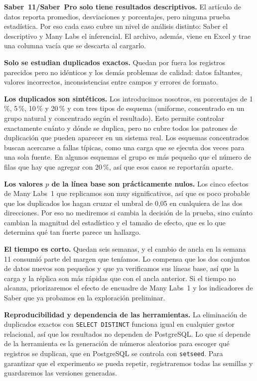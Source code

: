 \documentclass[11pt,openany,oneside,letterpaper]{book}
\begin{document}
\textbf{Saber~11/Saber~Pro solo tiene resultados descriptivos.} El artículo de datos reporta promedios, desviaciones y porcentajes, pero ninguna prueba estadística. Por eso cada caso cubre un nivel de análisis distinto: Saber el descriptivo y Many Labs el inferencial. El archivo, además, viene en Excel y trae una columna vacía que se descarta al cargarlo.

\textbf{Solo se estudian duplicados exactos.} Quedan por fuera los registros parecidos pero no idénticos y los demás problemas de calidad: datos faltantes, valores incorrectos, inconsistencias entre campos y errores de formato.

\textbf{Los duplicados son sintéticos.} Los introducimos nosotros, en porcentajes de 1\,\%, 5\,\%, 10\,\% y 20\,\% y con tres tipos de esquema (uniforme, concentrado en un grupo natural y concentrado según el resultado). Esto permite controlar exactamente cuánto y dónde se duplica, pero no cubre todos los patrones de duplicación que pueden aparecer en un sistema real. Los esquemas concentrados buscan acercarse a fallas típicas, como una carga que se ejecuta dos veces para una sola fuente. En algunos esquemas el grupo es más pequeño que el número de filas que hay que agregar con 20\,\%, así que esos casos se reportarán aparte.

\textbf{Los valores $p$ de la línea base son prácticamente nulos.} Los cinco efectos de Many Labs~1 que replicamos son muy significativos, así que es poco probable que los duplicados los hagan cruzar el umbral de 0,05 en cualquiera de las dos direcciones. Por eso no mediremos si cambia la decisión de la prueba, sino cuánto cambian la magnitud del estadístico y el tamaño de efecto, que es lo que determina qué tan fuerte parece un hallazgo.

\textbf{El tiempo es corto.} Quedan seis semanas, y el cambio de ancla en la semana 11 consumió parte del margen que teníamos. Lo compensa que los dos conjuntos de datos nuevos son pequeños y que ya verificamos sus líneas base, así que la carga y la réplica son más rápidas que con el ancla anterior. Si el tiempo no alcanza, priorizaremos el efecto de encuadre de Many Labs~1 y los indicadores de Saber que ya probamos en la exploración preliminar.

\textbf{Reproducibilidad y dependencia de las herramientas.} La eliminación de duplicados exactos con \texttt{SELECT DISTINCT} funciona igual en cualquier gestor relacional, así que los resultados no dependen de PostgreSQL. Lo que sí depende de la herramienta es la generación de números aleatorios para escoger qué registros se duplican, que en PostgreSQL se controla con \texttt{setseed}. Para garantizar que el experimento se pueda repetir, registraremos todas las semillas y guardaremos las versiones generadas.
\end{document}
